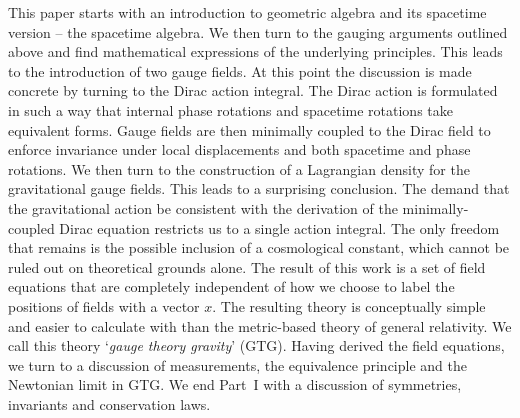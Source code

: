 \documentclass[a4paper]{article}
\numberwithin{equation}{section}
\begin{document}
This paper starts with an introduction to geometric algebra and its
spacetime version -- the spacetime algebra.  We then turn to the
gauging arguments outlined above and find mathematical expressions of
the underlying principles.  This leads to the introduction of two
gauge fields.  At this point the discussion is made concrete by
turning to the Dirac action integral.  The Dirac action is formulated
in such a way that internal phase rotations and spacetime rotations
take equivalent forms.  Gauge fields are then minimally coupled to the
Dirac field to enforce invariance under local displacements and both
spacetime and phase rotations.  We then turn to the construction of a
Lagrangian density for the gravitational gauge fields.  This leads to
a surprising conclusion.  The demand that the gravitational action be
consistent with the derivation of the minimally-coupled Dirac equation
restricts us to a single action integral.  The only freedom that
remains is the possible inclusion of a cosmological constant, which
cannot be ruled out on theoretical grounds alone.  The result of this
work is a set of field equations that are completely independent of
how we choose to label the positions of fields with a vector $x$.  The
resulting theory is conceptually simple and easier to calculate with
than the metric-based theory of general relativity.  We call this
theory `\textit{gauge theory gravity}' (GTG).  Having derived the
field equations, we turn to a discussion of measurements, the
equivalence principle and the Newtonian limit in GTG.  We end Part~I
with a discussion of symmetries, invariants and conservation laws.
\end{document}
